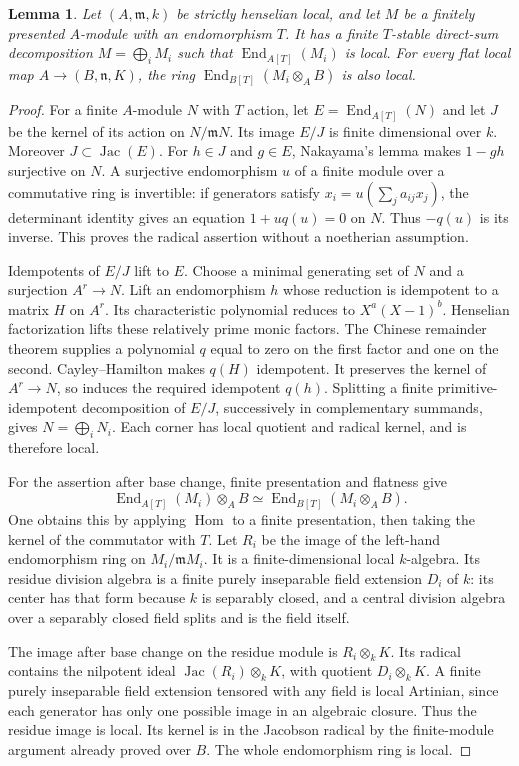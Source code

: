 \documentclass[11pt]{article}
\newtheorem{lemma}[theorem]{Lemma}
\theoremstyle{definition}\newtheorem{definition}[theorem]{Definition}
\theoremstyle{remark}\newtheorem{remark}[theorem]{Remark}
\newcommand{\Hom}{\operatorname{Hom}}
\newcommand{\End}{\operatorname{End}}
\newcommand{\Jac}{\operatorname{Jac}}
\begin{document}
\begin{lemma}\label{lem:indecomposable}
Let $(A,\mathfrak m,k)$ be strictly henselian local, and let $M$ be a finitely presented $A$-module with an endomorphism $T$. It has a finite $T$-stable direct-sum decomposition $M=\bigoplus_iM_i$ such that $\End_{A[T]}(M_i)$ is local. For every flat local map $A\to(B,\mathfrak n,K)$, the ring $\End_{B[T]}(M_i\otimes_A B)$ is also local.
\end{lemma}
\begin{proof}
For a finite $A$-module $N$ with $T$ action, let $E=\End_{A[T]}(N)$ and let $J$ be the kernel of its action on $N/\mathfrak mN$. Its image $E/J$ is finite dimensional over $k$. Moreover $J\subset\Jac(E)$. For $h\in J$ and $g\in E$, Nakayama's lemma makes $1-gh$ surjective on $N$. A surjective endomorphism $u$ of a finite module over a commutative ring is invertible: if generators satisfy $x_i=u(\sum_j a_{ij}x_j)$, the determinant identity gives an equation $1+u q(u)=0$ on $N$. Thus $-q(u)$ is its inverse. This proves the radical assertion without a noetherian assumption.

Idempotents of $E/J$ lift to $E$. Choose a minimal generating set of $N$ and a surjection $A^r\to N$. Lift an endomorphism $h$ whose reduction is idempotent to a matrix $H$ on $A^r$. Its characteristic polynomial reduces to $X^a(X-1)^b$. Henselian factorization lifts these relatively prime monic factors. The Chinese remainder theorem supplies a polynomial $q$ equal to zero on the first factor and one on the second. Cayley--Hamilton makes $q(H)$ idempotent. It preserves the kernel of $A^r\to N$, so induces the required idempotent $q(h)$. Splitting a finite primitive-idempotent decomposition of $E/J$, successively in complementary summands, gives $N=\bigoplus_iN_i$. Each corner has local quotient and radical kernel, and is therefore local.

For the assertion after base change, finite presentation and flatness give
\[
 \End_{A[T]}(M_i)\otimes_A B
   \simeq\End_{B[T]}(M_i\otimes_A B).
\]
One obtains this by applying $\Hom$ to a finite presentation, then taking the kernel of the commutator with $T$. Let $R_i$ be the image of the left-hand endomorphism ring on $M_i/\mathfrak mM_i$. It is a finite-dimensional local $k$-algebra. Its residue division algebra is a finite purely inseparable field extension $D_i$ of $k$: its center has that form because $k$ is separably closed, and a central division algebra over a separably closed field splits and is the field itself.

The image after base change on the residue module is $R_i\otimes_k K$. Its radical contains the nilpotent ideal $\Jac(R_i)\otimes_k K$, with quotient $D_i\otimes_k K$. A finite purely inseparable field extension tensored with any field is local Artinian, since each generator has only one possible image in an algebraic closure. Thus the residue image is local. Its kernel is in the Jacobson radical by the finite-module argument already proved over $B$. The whole endomorphism ring is local.
\end{proof}
\end{document}
